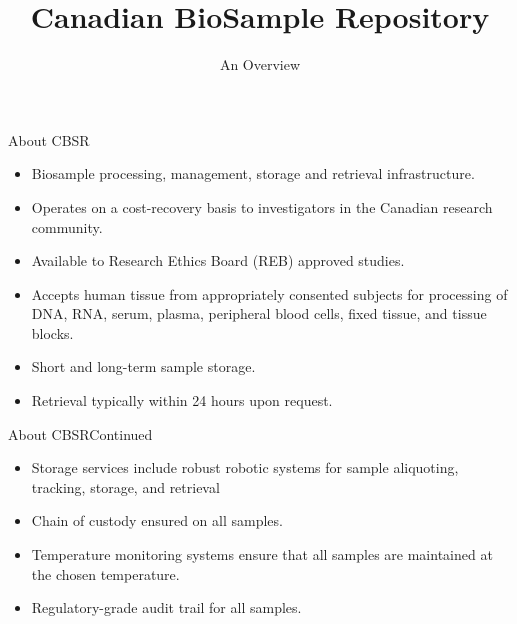\documentclass[hyperref={pdfpagelabels=false}]{beamer}
\title[CBSR Overview]{Canadian BioSample Repository}
\subtitle{An Overview}
\author{}
\institute{Prepared by AICML}
\begin{document}
\begin{frame}
  \titlepage
\end{frame}



\begin{frame}{About CBSR}
  \begin{itemize}
    \item Biosample processing, management, storage and retrieval
      infrastructure.
    \item Operates on a cost-recovery basis to investigators in the Canadian
      research community.
    \item Available to Research Ethics Board (REB) approved studies.
    \item Accepts human tissue from appropriately consented subjects for
      processing of DNA, RNA, serum, plasma, peripheral blood cells, fixed
      tissue, and tissue blocks.
    \item Short and long-term sample storage.
    \item Retrieval typically within 24 hours upon request.
  \end{itemize}
\end{frame}

\begin{frame}{About CBSR}{Continued}
  \begin{itemize}
    \item Storage services include robust robotic systems for sample
      aliquoting, tracking, storage, and retrieval
    \item Chain of custody ensured on all samples.
    \item Temperature monitoring systems ensure that all samples are maintained
      at the chosen temperature.
    \item Regulatory-grade audit trail for all samples.
  \end{itemize}
\end{frame}
\end{document}
